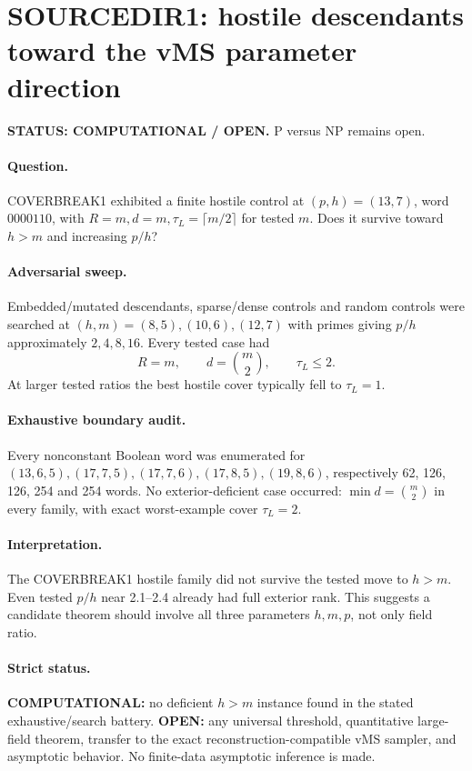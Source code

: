 \documentclass[11pt]{article}
\begin{document}
\section*{SOURCEDIR1: hostile descendants toward the vMS parameter direction}
\textbf{STATUS: COMPUTATIONAL / OPEN.} P versus NP remains open.

\paragraph{Question.} COVERBREAK1 exhibited a finite hostile control at \((p,h)=(13,7)\), word \(0000110\), with \(R=m,d=m,\tau_L=\lceil m/2\rceil\) for tested \(m\). Does it survive toward \(h>m\) and increasing \(p/h\)?

\paragraph{Adversarial sweep.} Embedded/mutated descendants, sparse/dense controls and random controls were searched at \((h,m)=(8,5),(10,6),(12,7)\) with primes giving \(p/h\) approximately \(2,4,8,16\). Every tested case had
\[\boxed{R=m,\qquad d=\binom m2,\qquad \tau_L\le2.}\]
At larger tested ratios the best hostile cover typically fell to \(\tau_L=1\).

\paragraph{Exhaustive boundary audit.} Every nonconstant Boolean word was enumerated for \((13,6,5),(17,7,5),(17,7,6),(17,8,5),(19,8,6)\), respectively 62, 126, 126, 254 and 254 words. No exterior-deficient case occurred: \(\min d=\binom m2\) in every family, with exact worst-example cover \(\tau_L=2\).

\paragraph{Interpretation.} The COVERBREAK1 hostile family did not survive the tested move to \(h>m\). Even tested \(p/h\) near 2.1--2.4 already had full exterior rank. This suggests a candidate theorem should involve all three parameters \(h,m,p\), not only field ratio.

\paragraph{Strict status.} \textbf{COMPUTATIONAL:} no deficient \(h>m\) instance found in the stated exhaustive/search battery. \textbf{OPEN:} any universal threshold, quantitative large-field theorem, transfer to the exact reconstruction-compatible vMS sampler, and asymptotic behavior. No finite-data asymptotic inference is made.
\end{document}
